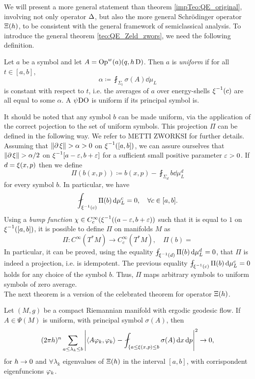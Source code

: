We will present a more general statement than theorem \ref{impTeo:QE_original}, involving not only operator $\operatorname{\Delta}$, but also the more general Schr{\"o}dinger operator $\Xi(h)$, to be consistent with the general framework of semiclassical analysis. To introduce the general theorem \ref{teo:QE_Zeld_zwors}, we need the following definition.

\begin{defin}
Let $a$ be a symbol and let $A=\operatorname{Op}^{w}(a)(q,h\operatorname{D})$. Then $a$ is \emph{uniform} if for all $t\in[a,b]$,
\[
\alpha\coloneqq\fint_{\Sigma_{t}}\sigma(A)\dd\mu_{L}
\]
is constant with respect to $t$, i.e. the averages of $a$ over energy-shells $\operatorname{\xi}^{-1}(c)$ are all equal to some $\alpha$. A $\operatorname{\psi DO}$ is uniform if its principal symbol is.
\end{defin}

It should be noted that any symbol $b$ can be made uniform, via the application of the correct pojection to the set of uniform symbols. This projection $\Pi$ can be defined in the following way. We refer to METTI ZWORKSI for further details. Assuming that $\left\lVert \partial\operatorname{\xi}\right\rVert>\alpha>0$ on $\operatorname{\xi}^{-1}([a,b])$, we can assure ourselves that $\left\lVert \partial\operatorname{\xi}\right\rVert>\alpha/2$ on $\operatorname{\xi}^{-1}[a-\varepsilon,b+\varepsilon]$ for a sufficient small positive parameter $\varepsilon>0$. If $d=\operatorname{\xi}(x,p)$ then we define
\[
\Pi\left(b(x,p)\right)\coloneqq b(x,p)-\fint_{\Sigma_{d}}b\dd\mu_{L}^{d}
\]
for every symbol $b$. In particular, we have
\[
\fint_{\Ham^{-1}(c)}\Pi(b)\dd\mu_{L}^{c}=0,\quad\forall c\in[a,b].
\]
Using a \emph{bump function} $\chi\in C_{c}^{\infty}(\operatorname{\xi}^{-1}((a-\varepsilon,b+\varepsilon))$ such that it is equal to $1$ on $\operatorname{\xi}^{-1}([a,b])$, it is possible to define $\Pi$ on manifolds $M$ as 
\[
\Pi\colon C^{\infty}(T^{\ast}M)\to C_{c}^{\infty}(T^{\ast}M),\quad \Pi(b)=
\]
In particular, it can be proved, using the equality $\fint_{\Ham^{-1}(d)}\Pi(b)\dd\mu^{d}_{L}=0$, that $\Pi$ is indeed a projection, i.e. is idempotent. The previous equality $\fint_{\Ham^{-1}(c)}\Pi(b)\dd\mu^{c}_{L}=0$ holds for any choice of the symbol $b$. Thus, $\Pi$ maps arbitrary symbols to uniform symbols of zero average.\\

The next theorem is a version of the celebrated \QE theorem for operator $\Xi(h)$.

\begin{nteo}
\label{teo:QE_Zeld_zwors}
Let $(M,g)$ be a compact Riemannian manifold with ergodic geodesic flow. If $A\in\Psi(M)$ is uniform, with principal symbol $\sigma(A)$, then 
\[
(2\pi\planck)^{n}\sum_{a\leq \lambda_{k}\leq b}\abs{
\pscl{A\vphi_{k}}{\vphi_{k}}-\fint_{\{a\leq\Ham(x,p)\leq b}\sigma(A)\dd x\dd p
}^{2}\to0,
\]
for $h\to0$ and $\forall\lambda_{k}$ eigenvalues of $\Xi(h)$ in the interval $[a,b]$, with corrispondent eigenfuncions $\varphi_{k}$.
\end{nteo}

